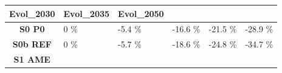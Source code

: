 \documentclass[]{article}
\begin{document}
\begin{longtable}[]{@{}clllll@{}}
\begin{minipage}[b]{0.13\columnwidth}
Evol\_2030\strut
\end{minipage} & \begin{minipage}[b]{0.13\columnwidth}\raggedright\strut
Evol\_2035\strut
\end{minipage} & \begin{minipage}[b]{0.13\columnwidth}\raggedright\strut
Evol\_2050\strut
\end{minipage}\tabularnewline
\midrule
\endhead
\begin{minipage}[t]{0.18\columnwidth}\centering\strut
\textbf{S0 P0}\strut
\end{minipage} & \begin{minipage}[t]{0.13\columnwidth}\raggedright\strut
0 \%\strut
\end{minipage} & \begin{minipage}[t]{0.13\columnwidth}\raggedright\strut
-5.4 \%\strut
\end{minipage} & \begin{minipage}[t]{0.13\columnwidth}\raggedright\strut
-16.6 \%\strut
\end{minipage} & \begin{minipage}[t]{0.13\columnwidth}\raggedright\strut
-21.5 \%\strut
\end{minipage} & \begin{minipage}[t]{0.13\columnwidth}\raggedright\strut
-28.9 \%\strut
\end{minipage}\tabularnewline
\begin{minipage}[t]{0.18\columnwidth}\centering\strut
\textbf{S0b REF}\strut
\end{minipage} & \begin{minipage}[t]{0.13\columnwidth}\raggedright\strut
0 \%\strut
\end{minipage} & \begin{minipage}[t]{0.13\columnwidth}\raggedright\strut
-5.7 \%\strut
\end{minipage} & \begin{minipage}[t]{0.13\columnwidth}\raggedright\strut
-18.6 \%\strut
\end{minipage} & \begin{minipage}[t]{0.13\columnwidth}\raggedright\strut
-24.8 \%\strut
\end{minipage} & \begin{minipage}[t]{0.13\columnwidth}\raggedright\strut
-34.7 \%\strut
\end{minipage}\tabularnewline
\begin{minipage}[t]{0.18\columnwidth}\centering\strut
\textbf{S1 AME}\strut

\end{minipage}
\end{longtable}
\end{document}
